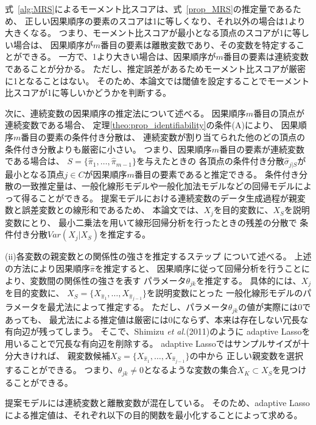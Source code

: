 式~\eqref{alg:MRS}によるモーメント比スコアは、式~\eqref{prop_MRS}の推定量であるため、
正しい因果順序の要素のスコアは1に等しくなり、それ以外の場合は1より大きくなる。
つまり、モーメント比スコアが最小となる頂点のスコアが1に等しい場合は、
因果順序が$m$番目の要素は離散変数であり、その変数を特定することができる。
一方で、1より大きい場合は、因果順序が$m$番目の要素は連続変数であることが分かる。
ただし、推定誤差があるためモーメント比スコアが厳密に1となることはない。
そのため、本論文では閾値を設定することでモーメント比スコアが1に等しいかどうかを判断する。

次に、連続変数の因果順序の推定法について述べる。
因果順序$m$番目の頂点が連続変数である場合、
定理\ref{theo:prop_identifiability}の条件(A)により、
因果順序$m$番目の要素の条件付き分散は、
連続変数が割り当てられた他のどの頂点の条件付き分散よりも厳密に小さい。
つまり、因果順序$m$番目の要素が連続変数である場合は、
$S =\{\widehat{\pi}_1, \dots, \widehat{\pi}_{m-1}\}$を与えたときの
各頂点の条件付き分散$\widehat{\sigma}_{j|S}$が
最小となる頂点$j \in C$が因果順序$m$番目の要素であると推定できる。
条件付き分散の一致推定量は、一般化線形モデルや一般化加法モデルなどの回帰モデルによって得ることができる。
提案モデルにおける連続変数のデータ生成過程が親変数と誤差変数との線形和であるため、
本論文では、$X_j$を目的変数に、$X_S$を説明変数にとり、
最小二乗法を用いて線形回帰分析を行ったときの残差の分散で
条件付き分散$\mathit{Var}(X_j|X_S)$を推定する。

(ii)各変数の親変数との関係性の強さを推定するステップ について述べる。
上述の方法により因果順序$\widehat{\pi}$を推定すると、
因果順序に従って回帰分析を行うことにより、変数間の関係性の強さを表す
パラメータ$\theta_{jk}$を推定する。
具体的には、$X_j$を目的変数に、
$X_S = \{ X_{\widehat{\pi}_1}, \dots, X_{\widehat{\pi}_{j-1}}\}$を説明変数にとった
一般化線形モデルのパラメータを最尤法によって推定する。
ただし、パラメータ$\theta_{jk}$の値が実際には0であっても、
最尤法による推定値は厳密には0にならず、本来は存在しない冗長な有向辺が残ってしまう。
そこで、Shimizu \textit{et al.}(2011)\cite{Shimizu2011-pd}のように
adaptive Lasso\cite{Zou2006-pi}を用いることで冗長な有向辺を削除する。
adaptive Lassoではサンプルサイズが十分大きければ、
親変数候補$X_S = \{ X_{\widehat{\pi}_1}, \dots, X_{\widehat{\pi}_{j-1}}\}$の中から
正しい親変数を選択することができる。
つまり、$\theta_{jk} \neq 0$となるような変数の集合$X_K \subset X_S$を見つけることができる。

提案モデルには連続変数と離散変数が混在している。
そのため、adaptive Lassoによる推定値は、それぞれ以下の目的関数を最小化することによって求める。

